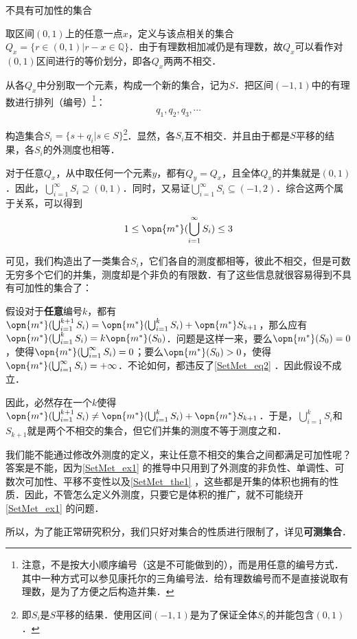 \begin{example}{不具有可加性的集合}\label{SetMet_ex1}

取区间$(0, 1)$上的任意一点$x$，定义与该点相关的集合$Q_x=\{r\in(0, 1)|r-x\in\mathbb{Q}\}$．由于有理数相加减仍是有理数，故$Q_x$可以看作对$(0, 1)$区间进行的等价划分，即各$Q_x$两两不相交．

从各$Q_x$中分别取一个元素，构成一个新的集合，记为$S$．把区间$(-1, 1)$中的有理数进行排列（编号）\footnote{注意，不是按大小顺序编号（这是不可能做到的），而是用任意的编号方式．其中一种方式可以参见康托尔的三角编号法．给有理数编号而不是直接说取有理数，是为了方便之后构造并集．}：
\begin{equation}
q_1, q_2, q_3, \cdots 
\end{equation}

构造集合$S_i=\{s+q_i|s\in S\}$\footnote{即$S_i$是$S$平移的结果．使用区间$(-1, 1)$是为了保证全体$S_i$的并能包含$(0, 1)$．}．显然，各$S_i$互不相交．并且由于都是$S$平移的结果，各$S_i$的外测度也相等．

对于任意$Q_x$，从中取任何一个元素$y$，都有$Q_y=Q_x$，且全体$Q_x$的并集就是$(0, 1)$．因此，$\bigcup_{i=1}^\infty S_i\supseteq (0, 1)$．同时，又易证$\bigcup_{i=1}^\infty S_i\subseteq (-1, 2)$．综合这两个属于关系，可以得到
\begin{equation}\label{SetMet_eq2}
1\leq\opn{m^*}(\bigcup_{i=1}^\infty S_i)\leq 3
\end{equation}

可见，我们构造出了一类集合$S_i$，它们各自的测度都相等，彼此不相交，但是可数无穷多个它们的并集，测度却是个非负的有限数．有了这些信息就很容易得到不具有可加性的集合了：

假设对于\textbf{任意}编号$k$，都有$\opn{m^*}(\bigcup_{i=1}^{k+1} S_i)=\opn{m^*}(\bigcup_{i=1}^k S_i)+\opn{m^*}S_{k+1}$，那么应有$\opn{m^*}(\bigcup_{i=1}^{k} S_i)=k\opn{m^*}(S_0)$．问题是这样一来，要么$\opn{m^*}(S_0)=0$，使得$\opn{m^*}(\bigcup_{i=1}^\infty S_i)=0$；要么$\opn{m^*}(S_0)>0$，使得$\opn{m^*}(\bigcup_{i=1}^\infty S_i)=+\infty$．不论如何，都违反了\autoref{SetMet_eq2} ．因此假设不成立．

因此，必然存在一个$k$使得$\opn{m^*}(\bigcup_{i=1}^{k+1} S_i) \neq \opn{m^*}(\bigcup_{i=1}^k S_i)+\opn{m^*}S_{k+1}$．于是，$\bigcup_{i=1}^k S_i$和$S_{k+1}$就是两个不相交的集合，但它们并集的测度不等于测度之和．


\end{example}

我们能不能通过修改外测度的定义，来让任意不相交的集合之间都满足可加性呢？答案是不能，因为\autoref{SetMet_ex1} 的推导中只用到了外测度的非负性、单调性、可数次可加性、平移不变性以及\autoref{SetMet_the1} ，这些都是开集的体积也拥有的性质．因此，不管怎么定义外测度，只要它是体积的推广，就不可能绕开\autoref{SetMet_ex1} 的问题．

所以，为了能正常研究积分，我们只好对集合的性质进行限制了，详见\textbf{可测集合}．


















